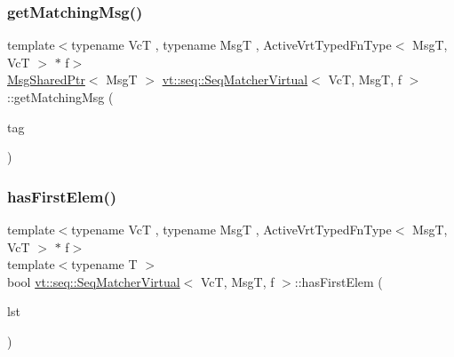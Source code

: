 \mbox{\label{structvt_1_1seq_1_1_seq_matcher_virtual_a96c97161692124a9c0ad629d4e1d9639}} 
\subsubsection{\texorpdfstring{get\+Matching\+Msg()}{getMatchingMsg()}}
{\footnotesize\ttfamily template$<$typename VcT , typename MsgT , Active\+Vrt\+Typed\+Fn\+Type$<$ Msg\+T, Vc\+T $>$ $\ast$ f$>$ \\
\hyperlink{namespacevt_ab2b3d506ec8e8d1540aede826d84a239}{Msg\+Shared\+Ptr}$<$ MsgT $>$ \hyperlink{structvt_1_1seq_1_1_seq_matcher_virtual}{vt\+::seq\+::\+Seq\+Matcher\+Virtual}$<$ VcT, MsgT, f $>$\+::get\+Matching\+Msg (\begin{DoxyParamCaption}\item[{\hyperlink{namespacevt_a84ab281dae04a52a4b243d6bf62d0e52}{Tag\+Type} const \&}]{tag }\end{DoxyParamCaption})\hspace{0.3cm}{\ttfamily [static]}}

\mbox{\label{structvt_1_1seq_1_1_seq_matcher_virtual_ac21aec817ce2f7a0ff64f39e6a7bce62}} 
\subsubsection{\texorpdfstring{has\+First\+Elem()}{hasFirstElem()}}
{\footnotesize\ttfamily template$<$typename VcT , typename MsgT , Active\+Vrt\+Typed\+Fn\+Type$<$ Msg\+T, Vc\+T $>$ $\ast$ f$>$ \\
template$<$typename T $>$ \\
bool \hyperlink{structvt_1_1seq_1_1_seq_matcher_virtual}{vt\+::seq\+::\+Seq\+Matcher\+Virtual}$<$ VcT, MsgT, f $>$\+::has\+First\+Elem (\begin{DoxyParamCaption}\item[{T \&}]{lst }\end{DoxyParamCaption})\hspace{0.3cm}{\ttfamily [static]}}

